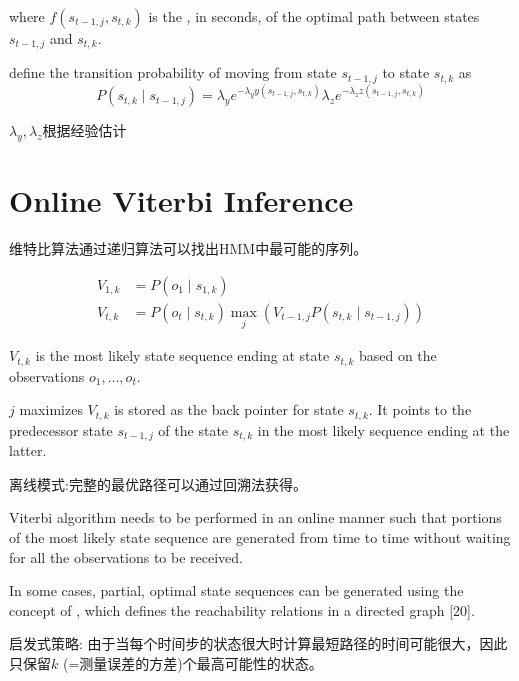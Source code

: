where $ f\left(s_{t-1, j}, s_{t, k}\right) $ is the , in seconds, of the optimal path between states $ s_{t-1, j} $ and $ s_{t, k} $.

define the transition probability of moving from state $ s_{t-1, j} $ to state $ s_{t, k} $ as
\begin{equation}
P\left(s_{t, k} \mid s_{t-1, j}\right)=\lambda_{y} e^{-\lambda_{y} y\left(s_{t-1, j}, s_{t, k}\right)} \lambda_{z} e^{-\lambda_{z} z\left(s_{t-1, j}, s_{t, k}\right)}
\end{equation}

$\lambda_{y}, \lambda_{z}$根据经验估计

\section{Online Viterbi Inference}

维特比算法通过递归算法可以找出HMM中最可能的序列。 

\begin{equation} \begin{aligned} V_{1, k} &=P\left(o_{1} \mid s_{1, k}\right) \\ V_{t, k} &=P\left(o_{t} \mid s_{t, k}\right) \max _{j}\left(V_{t-1, j} P\left(s_{t, k} \mid s_{t-1, j}\right)\right) \end{aligned} \end{equation}

$ V_{t, k} $ is the most likely state sequence ending at state $ s_{t, k} $ based on the observations $ o_{1}, \ldots, o_{t} . $

$j$ maximizes
$V_{t, k}$ is stored as the back pointer for state $s_{t, k}$. It points to the predecessor state $s_{t-1, j}$ of the state $s_{t, k}$ in the most likely sequence ending at the latter.

离线模式:完整的最优路径可以通过回溯法获得。

Viterbi algorithm needs to be performed in
an online manner such that portions of the most likely state
sequence are generated from time to time without waiting for
all the observations to be received.

In some cases, partial,
optimal state sequences can be generated using the concept
of , which defines the reachability relations
in a directed graph [20].

启发式策略: 由于当每个时间步的状态很大时计算最短路径的时间可能很大，因此只保留$k$ (=测量误差的方差)个最高可能性的状态。

